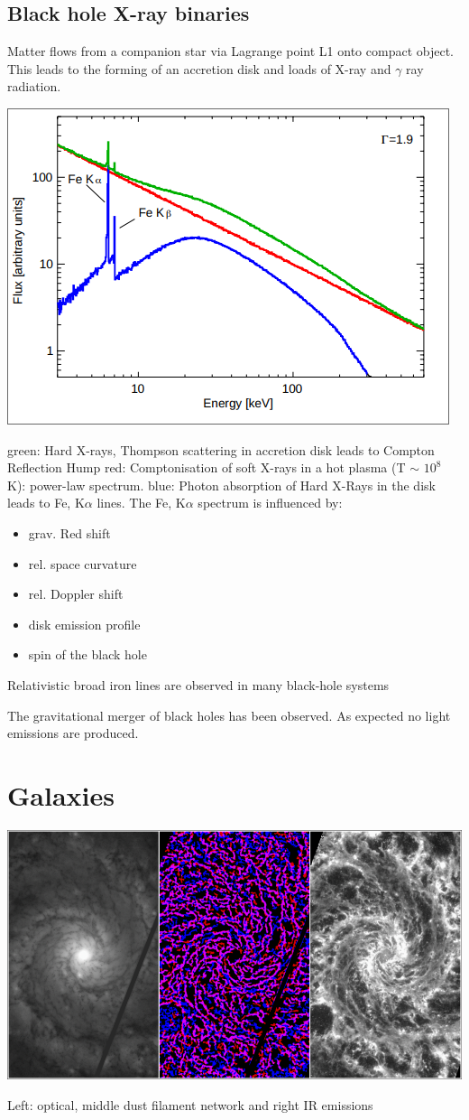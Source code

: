 \documentclass[11pt,a4paper]{article}
\begin{document}
\subsection{Black hole X-ray binaries}
Matter flows from a companion star via Lagrange point L1 onto compact object.
This leads to the forming of an accretion disk and loads of X-ray and $\gamma$ ray radiation.
\begin{center}
    \includegraphics[width=0.5\linewidth]{screenshot_2024-01-24-113302.png}
\end{center}
green: Hard X-rays, Thompson scattering in accretion disk leads to Compton Reflection Hump
red: Comptonisation of soft X-rays in a hot plasma (T $\sim$ $10^8$ K): power-law spectrum.
blue: Photon absorption of Hard X-Rays in the disk leads to Fe, K$\alpha$ lines. 
The Fe, K$\alpha$ spectrum is influenced by:
\begin{itemize}
    \item grav. Red shift
    \item rel. space curvature 
    \item rel. Doppler shift
    \item disk emission profile
    \item spin of the black hole
\end{itemize}
Relativistic broad iron
lines are observed in
many black-hole systems

The gravitational merger of black holes has been observed.
As expected no light emissions are produced. 

\section{Galaxies}
\begin{center}
    \includegraphics[width=1\linewidth]{screenshot_2024-01-24-120045.png}
\end{center}
Left: optical, middle dust filament network and right IR emissions
\end{document}
